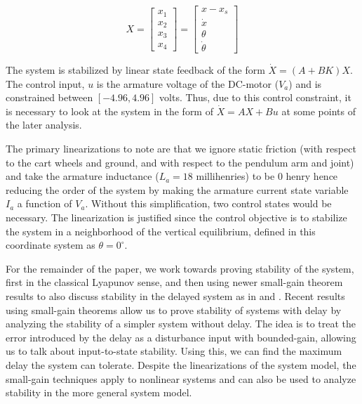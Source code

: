 \documentclass[conference]{IEEEtran}
\begin{document}
\begin{equation}
X=\left[ \begin{array}{c} x_1 \\ x_{2} \\ x_3 \\ x_{4} \end{array} \right]=\left[ \begin{array}{cccc} x-x_s \\ \dot{x} \\ \theta \\ \dot{\theta} \end{array} \right]
\label{eq:stateMatrix}
\end{equation}

The system is stabilized by linear state feedback of the form $\dot{X}=\left(A+BK\right)X$.  The control input, $u$ is the armature voltage of the DC-motor ($V_a$) and is constrained between $\left[-4.96,4.96\right]$ volts.  Thus, due to this control constraint, it is necessary to look at the system in the form of $\dot{X}=AX+Bu$ at some points of the later analysis.

The primary linearizations to note are that we ignore static friction (with respect to the cart wheels and ground, and with respect to the pendulum arm and joint) and take the armature inductance ($L_a=18$ millihenries) to be $0$ henry hence reducing the order of the system by making the armature current state variable $I_a$ a function of $V_a$.  Without this simplification, two control states would be necessary.  The linearization is justified since the control objective is to stabilize the system in a neighborhood of the vertical equilibrium, defined in this coordinate system as $\theta=0^{\circ}$.

For the remainder of the paper, we work towards proving stability of the system, first in the classical Lyapunov sense, and then using newer small-gain theorem results to also discuss stability in the delayed system as in \cite{LiberzonQuantDelay2006} and \cite{SanfeliceTeel2005}.  Recent results using small-gain theorems allow us to prove stability of systems with delay by analyzing the stability of a simpler system without delay.  The idea is to treat the error introduced by the delay as a disturbance input with bounded-gain, allowing us to talk about input-to-state stability.  Using this, we can find the maximum delay the system can tolerate.  Despite the linearizations of the system model, the small-gain techniques apply to nonlinear systems and can also be used to analyze stability in the more general system model.
\end{document}
